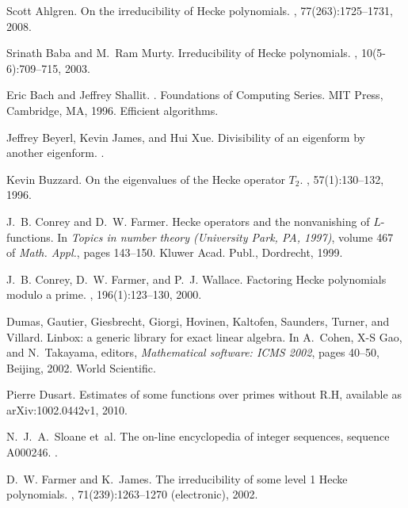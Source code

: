 \documentclass{book}
\begin{document}
\begin{thebibliography}{10}

Scott Ahlgren.
\newblock On the irreducibility of {H}ecke polynomials.
, 77(263):1725--1731, 2008.

Srinath Baba and M.~Ram Murty.
\newblock Irreducibility of {H}ecke polynomials.
, 10(5-6):709--715, 2003.

Eric Bach and Jeffrey Shallit.
.
\newblock Foundations of Computing Series. MIT Press, Cambridge, MA, 1996.
\newblock Efficient algorithms.

Jeffrey Beyerl, Kevin James, and Hui Xue.
\newblock Divisibility of an eigenform by another eigenform.
.

Kevin Buzzard.
\newblock On the eigenvalues of the {H}ecke operator {$T_2$}.
, 57(1):130--132, 1996.

J.~B. Conrey and D.~W. Farmer.
\newblock Hecke operators and the nonvanishing of {$L$}-functions.
\newblock In {\em Topics in number theory ({U}niversity {P}ark, {PA}, 1997)},
  volume 467 of {\em Math. Appl.}, pages 143--150. Kluwer Acad. Publ.,
  Dordrecht, 1999.

J.~B. Conrey, D.~W. Farmer, and P.~J. Wallace.
\newblock Factoring {H}ecke polynomials modulo a prime.
, 196(1):123--130, 2000.

Dumas, Gautier, Giesbrecht, Giorgi, Hovinen, Kaltofen, Saunders, Turner, and
  Villard.
\newblock Linbox: a generic library for exact linear algebra.
\newblock In A.~Cohen, X-S Gao, and N.~Takayama, editors, {\em Mathematical
  software: ICMS 2002}, pages 40--50, Beijing, 2002. World Scientific.

Pierre Dusart.
\newblock Estimates of some functions over primes without {R}.{H},
\newblock available as arXiv:1002.0442v1, 2010.

N.~J.~A.~Sloane et~al.
\newblock The on-line encyclopedia of integer sequences, sequence {A}000246.
.

D.~W. Farmer and K.~James.
\newblock The irreducibility of some level 1 {H}ecke polynomials.
, 71(239):1263--1270 (electronic), 2002.


\end{thebibliography}
\end{document}
